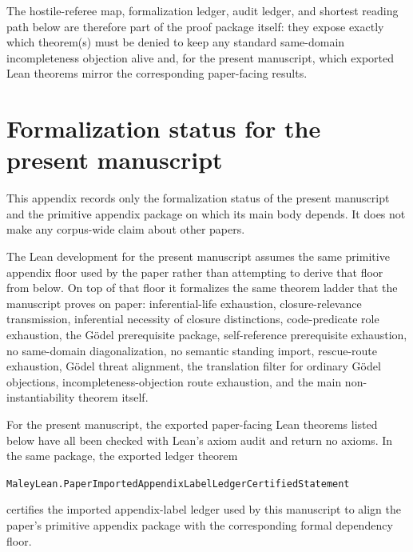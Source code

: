 \documentclass[11pt]{article}
\theoremstyle{plain}
\theoremstyle{definition}
\newcommand{\LeanInline}[1]{\nolinkurl{MaleyLean.#1}}
\begin{document}
The hostile-referee map, formalization ledger, audit ledger, and shortest reading path below are therefore part of the proof package itself: they expose exactly which theorem(s) must be denied to keep any standard same-domain incompleteness objection alive and, for the present manuscript, which exported Lean theorems mirror the corresponding paper-facing results.

\section{Formalization status for the present manuscript}
\label{app:formalization-status}

This appendix records only the formalization status of the present manuscript and the primitive appendix package on which its main body depends. It does not make any corpus-wide claim about other papers.

The Lean development for the present manuscript assumes the same primitive appendix floor used by the paper rather than attempting to derive that floor from below. On top of that floor it formalizes the same theorem ladder that the manuscript proves on paper: inferential-life exhaustion, closure-relevance transmission, inferential necessity of closure distinctions, code-predicate role exhaustion, the G\"odel prerequisite package, self-reference prerequisite exhaustion, no same-domain diagonalization, no semantic standing import, rescue-route exhaustion, G\"odel threat alignment, the translation filter for ordinary G\"odel objections, incompleteness-objection route exhaustion, and the main non-instantiability theorem itself.

For the present manuscript, the exported paper-facing Lean theorems listed below have all been checked with Lean's axiom audit and return no axioms. In the same package, the exported ledger theorem
\begin{center}
\small\LeanInline{PaperImportedAppendixLabelLedgerCertifiedStatement}
\end{center}
certifies the imported appendix-label ledger used by this manuscript to align the paper's primitive appendix package with the corresponding formal dependency floor.
\end{document}
